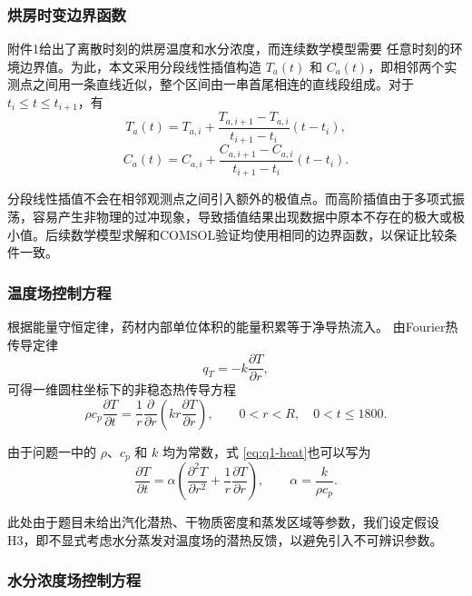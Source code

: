 \documentclass[12pt,a4paper]{article}
\renewcommand{\boxed}[1]{#1}
\begin{document}
\subsubsection{烘房时变边界函数}

附件1给出了离散时刻的烘房温度和水分浓度，而连续数学模型需要
任意时刻的环境边界值。为此，本文采用分段线性插值构造
$T_a(t)$ 和 $C_a(t)$，即相邻两个实测点之间用一条直线近似，整个区间由一串首尾相连的直线段组成。对于 $t_i\le t\le t_{i+1}$，有
\begin{equation}
T_a(t)
=
T_{a,i}
+
\frac{T_{a,i+1}-T_{a,i}}{t_{i+1}-t_i}
(t-t_i),
\end{equation}
\begin{equation}
C_a(t)
=
C_{a,i}
+
\frac{C_{a,i+1}-C_{a,i}}{t_{i+1}-t_i}
(t-t_i).
\end{equation}

分段线性插值不会在相邻观测点之间引入额外的极值点。而高阶插值由于多项式振荡，容易产生非物理的过冲现象，导致插值结果出现数据中原本不存在的极大或极小值。后续数学模型求解和COMSOL验证均使用相同的边界函数，以保证比较条件一致。

\subsubsection{温度场控制方程}

根据能量守恒定律，药材内部单位体积的能量积累等于净导热流入。
由Fourier热传导定律
\begin{equation}
q_T=-k\frac{\partial T}{\partial r},
\end{equation}
可得一维圆柱坐标下的非稳态热传导方程
\begin{equation}
\boxed{
\rho c_p\frac{\partial T}{\partial t}
=
\frac{1}{r}
\frac{\partial}{\partial r}
\left(
kr\frac{\partial T}{\partial r}
\right)
},
\qquad
0<r<R,\quad 0<t\le1800.
\label{eq:q1-heat}
\end{equation}

由于问题一中的 $\rho$、$c_p$ 和 $k$ 均为常数，式
\eqref{eq:q1-heat}也可以写为
\begin{equation}
\frac{\partial T}{\partial t}
=
\alpha
\left(
\frac{\partial^2T}{\partial r^2}
+
\frac{1}{r}\frac{\partial T}{\partial r}
\right),
\qquad
\alpha=\frac{k}{\rho c_p}.
\end{equation}

此处由于题目未给出汽化潜热、干物质密度和蒸发区域等参数，我们设定假设H3，即不显式考虑水分蒸发对温度场的潜热反馈，以避免引入不可辨识参数。

\subsubsection{水分浓度场控制方程}
\end{document}
